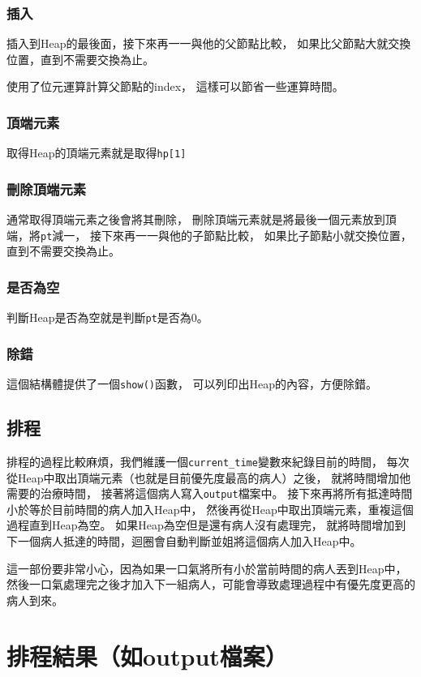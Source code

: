 \documentclass[12pt,a4paper]{article}
\begin{document}
\subsubsection{插入}
插入到Heap的最後面，接下來再一一與他的父節點比較，
如果比父節點大就交換位置，直到不需要交換為止。

使用了位元運算計算父節點的index，
這樣可以節省一些運算時間。

\subsubsection{頂端元素}
取得Heap的頂端元素就是取得\texttt{hp[1]}

\subsubsection{刪除頂端元素}
通常取得頂端元素之後會將其刪除，
刪除頂端元素就是將最後一個元素放到頂端，將\texttt{pt}減一，
接下來再一一與他的子節點比較，
如果比子節點小就交換位置，直到不需要交換為止。

\subsubsection{是否為空}
判斷Heap是否為空就是判斷\texttt{pt}是否為0。

\subsubsection{除錯}
這個結構體提供了一個\texttt{show()}函數，
可以列印出Heap的內容，方便除錯。

\subsection{排程}
排程的過程比較麻煩，我們維護一個\texttt{current\_time}變數來紀錄目前的時間，
每次從Heap中取出頂端元素（也就是目前優先度最高的病人）之後，
就將時間增加他需要的治療時間，
接著將這個病人寫入\texttt{output}檔案中。
接下來再將所有抵達時間小於等於目前時間的病人加入Heap中，
然後再從Heap中取出頂端元素，重複這個過程直到Heap為空。
如果Heap為空但是還有病人沒有處理完，
就將時間增加到下一個病人抵達的時間，迴圈會自動判斷並姐將這個病人加入Heap中。

這一部份要非常小心，因為如果一口氣將所有小於當前時間的病人丟到Heap中，
然後一口氣處理完之後才加入下一組病人，可能會導致處理過程中有優先度更高的病人到來。

\section{排程結果（如output檔案）}
\end{document}
